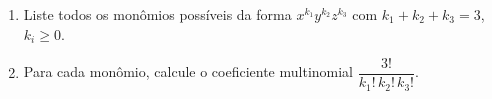 \documentclass[12pt]{article}
\begin{document}
\begin{enumerate}
\begin{enumerate}[label=\alph*)]
    \item Liste todos os monômios possíveis da forma $x^{k_1}y^{k_2}z^{k_3}$ com $k_1+k_2+k_3=3$, $k_i \geq 0$.
    \item Para cada monômio, calcule o coeficiente multinomial $\dfrac{3!}{k_1!\,k_2!\,k_3!}$.
\end{enumerate}

\vspace{0.2cm}
\begin{tcolorbox}[colback=white, colframe=maincolor, height=8cm, arc=2mm, boxrule=1pt]
\end{tcolorbox}


\end{enumerate}
\end{document}
